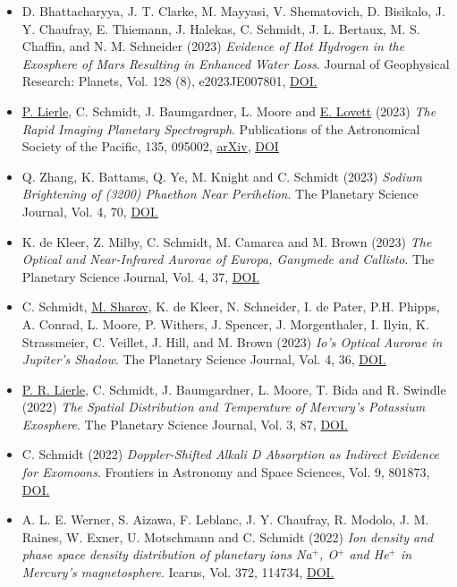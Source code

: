 \documentclass[12pt]{report}
\begin{document}
\begin{itemize} \itemsep -2pt %
  \item D. Bhattacharyya, J. T. Clarke, M. Mayyasi, V. Shematovich, D. Bisikalo, J. Y. Chaufray, E. Thiemann, J. Halekas, C. Schmidt, J. L. Bertaux, M. S. Chaffin, and N. M. Schneider (2023) \textit{Evidence of Hot Hydrogen in the Exosphere of Mars Resulting in Enhanced Water Loss}. Journal of Geophysical Research: Planets, Vol. 128 (8), e2023JE007801, \href{https://doi.org/10.1029/2023JE007801}{DOI.} 
  \item \underline{P. Lierle}, C. Schmidt, J. Baumgardner, L. Moore and \underline{E. Lovett} (2023) \textit{The Rapid Imaging Planetary Spectrograph}. Publications of the Astronomical Society of the Pacific, 135, 095002, \href{https://arxiv.org/abs/2307.16872}{arXiv}, \href{https://doi.org/10.1088/1538-3873/acec9f}{DOI}
  \item Q. Zhang, K. Battams, Q. Ye, M. Knight and C. Schmidt (2023) \textit{Sodium Brightening of (3200) Phaethon Near Perihelion}. The Planetary Science Journal, Vol. 4, 70, \href{https://doi.org/10.3847/PSJ/acc866}{DOI.} 
  \item K. de Kleer, Z. Milby, C. Schmidt, M. Camarca and M. Brown (2023) \textit{The Optical and Near-Infrared Aurorae of Europa, Ganymede and Callisto}. The Planetary Science Journal, Vol. 4, 37, \href{https://doi.org/10.3847/PSJ/acb53c}{DOI.} 
  \item C. Schmidt, \underline{M. Sharov}, K. de Kleer, N. Schneider, I. de Pater, P.H. Phipps, A. Conrad, L. Moore, P. Withers, J. Spencer, J. Morgenthaler, I. Ilyin, K. Strassmeier, C. Veillet, J. Hill, and M. Brown (2023) \textit{Io’s Optical Aurorae in Jupiter’s Shadow}. The Planetary Science Journal, Vol. 4, 36, \href{https://doi.org/10.3847/PSJ/ac85b0}{DOI.} 
  \item \underline{P. R. Lierle}, C. Schmidt, J. Baumgardner, L. Moore, T. Bida and R. Swindle (2022) \textit{The Spatial Distribution and Temperature of Mercury’s Potassium Exosphere}. The Planetary Science Journal, Vol. 3, 87, \href{https://doi.org/10.3847/PSJ/ac5c4d}{DOI.} 
  \item C. Schmidt (2022) \textit{Doppler-Shifted Alkali D Absorption as Indirect Evidence for Exomoons}. Frontiers in Astronomy and Space Sciences, Vol. 9, 801873, \href{https://doi.org/10.3389/fspas.2022.801873}{DOI.}
  \item A. L. E. Werner, S. Aizawa, F. Leblanc, J. Y. Chaufray, R. Modolo, J. M. Raines, W. Exner, U. Motschmann and C. Schmidt (2022) \textit{Ion density and phase space density distribution of planetary ions Na$^+$, O$^+$ and He$^+$ in Mercury's magnetosphere}. Icarus, Vol. 372, 114734, \href{https://doi.org/10.1016/j.icarus.2021.114734}{DOI.}

\end{itemize}
\end{document}
